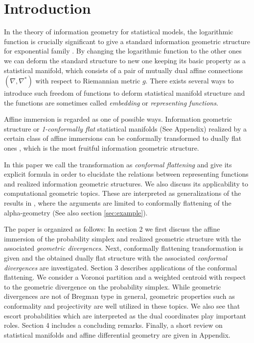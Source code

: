 \documentclass{llncs}
\begin{document}
\section{Introduction}
In the theory of information geometry for statistical models,
the logarithmic function is crucially significant to give a standard 
information geometric structure for exponential family \cite{AN}.
By changing the logarithmic
function to the other ones we can deform the standard structure 
to new one keeping its basic property as a statistical manifold, 
which consists of a pair of mutually dual affine connections 
$(\nabla, \nabla^*)$ with respect to Riemannian metric $g$.
There exists several ways \cite{Eguchi04,Zhang04,Naudts04} 
to introduce such freedom of functions to deform statistical manifold 
structure and the functions are sometimes called 
{\em embedding} or {\em representing functions}. 

Affine immersion \cite{NS} is regarded as one of possible ways.
Information geometric structure or {\em 1-conformally flat} 
statistical manifolds (See Appendix) realized by 
a certain class of affine immersions can be conformally transformed to 
dually flat ones \cite{Kurose94}, which is the most fruitful 
information geometric structure. 

In this paper we call the transformation as {\em conformal flattening} 
and give its explicit formula in order to 
elucidate the relations between representing functions and
realized information geometric structures.
We also discuss its applicability to 
computational geometric topics.
These are interpreted as generalizations of the results in \cite{OMA10,OMA12}, 
where the arguments are limited to conformally flattening of 
the alpha-geometry \cite{Amari85,AN} (See also section \ref{sec:example}).

The paper is organized as follows:
In section 2 we first discuss the affine immersion of 
the probability simplex and realized geometric structure with the associated 
{\em geometric divergences}. 
Next, conformally flattening transformation is given and the obtained dually 
flat structure with the associated {\em conformal divergences} 
are investigated.
Section 3 describes applications of the conformal flattening.
We consider a Voronoi partition and a weighted centroid 
with respect to the geometric divergence on the probability simplex.
While geometric divergences are not of Bregman type in general, 
geometric properties such as conformality and projectivity are well utilized 
in these topics.
We also see that escort probabilities 
which are interpreted as the dual coordinates play important roles.
Section 4 includes a concluding remarks.
Finally, a short review on statistical manifolds and 
affine differential geometry are given in Appendix.
\end{document}
